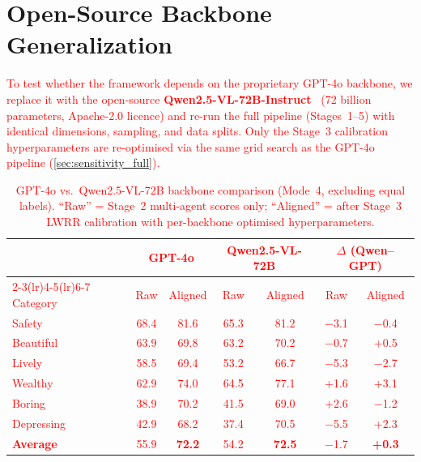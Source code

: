 \documentclass[runningheads]{llncs}
\begin{document}
\section{Open-Source Backbone Generalization}
\label{sec:backbone}

\textcolor{red}{%
To test whether the framework depends on the proprietary GPT-4o backbone, we replace it with the open-source \textbf{Qwen2.5-VL-72B-Instruct}~\cite{bai2025qwen25vl} (72 billion parameters, Apache-2.0 licence) and re-run the full pipeline (Stages~1--5) with identical dimensions, sampling, and data splits.
Only the Stage~3 calibration hyperparameters are re-optimised via the same grid search as the GPT-4o pipeline (\textcolor{red}{\cref{sec:sensitivity_full}}).
}

\begin{table}[h]
\centering
\caption{\textcolor{red}{GPT-4o vs.\ Qwen2.5-VL-72B backbone comparison (Mode~4, excluding equal labels). ``Raw'' = Stage~2 multi-agent scores only; ``Aligned'' = after Stage~3 LWRR calibration with per-backbone optimised hyperparameters.}}
\label{tab:backbone}
\small
\setlength{\tabcolsep}{3.5pt}
\textcolor{red}{%
\begin{tabular}{l cc cc cc}
\toprule
 & \multicolumn{2}{c}{\textbf{GPT-4o}} & \multicolumn{2}{c}{\textbf{Qwen2.5-VL-72B}} & \multicolumn{2}{c}{\textbf{$\Delta$ (Qwen--GPT)}} \\
\cmidrule(lr){2-3}\cmidrule(lr){4-5}\cmidrule(lr){6-7}
Category & Raw & Aligned & Raw & Aligned & Raw & Aligned \\
\midrule
Safety      & 68.4 & 81.6 & 65.3 & 81.2 & $-$3.1 & $-$0.4 \\
Beautiful   & 63.9 & 69.8 & 63.2 & 70.2 & $-$0.7 & +0.5 \\
Lively      & 58.5 & 69.4 & 53.2 & 66.7 & $-$5.3 & $-$2.7 \\
Wealthy     & 62.9 & 74.0 & 64.5 & 77.1 & +1.6 & +3.1 \\
Boring      & 38.9 & 70.2 & 41.5 & 69.0 & +2.6 & $-$1.2 \\
Depressing  & 42.9 & 68.2 & 37.4 & 70.5 & $-$5.5 & +2.3 \\
\midrule
\textbf{Average} & 55.9 & \textbf{72.2} & 54.2 & \textbf{72.5} & $-$1.7 & \textbf{+0.3} \\
\bottomrule
\end{tabular}%
}
\end{table}
\end{document}
